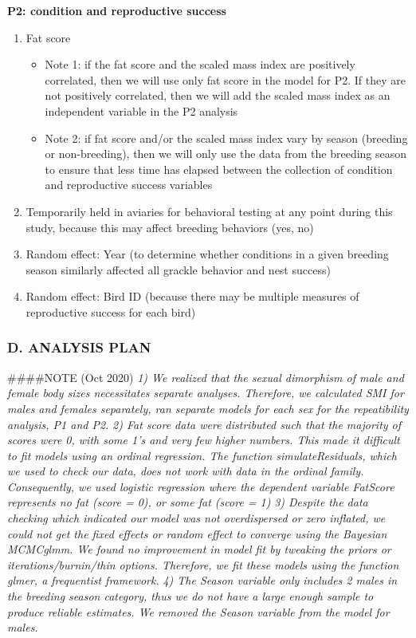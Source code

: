 \documentclass[
]{article}
\providecommand{\tightlist}{%
  \setlength{\itemsep}{0pt}\setlength{\parskip}{0pt}}
\begin{document}
\textbf{P2: condition and reproductive success}

\begin{enumerate}
\def\labelenumi{\arabic{enumi})}
\item
  Fat score

  \begin{itemize}
  \tightlist
  \item
    Note 1: if the fat score and the scaled mass index are positively
    correlated, then we will use only fat score in the model for P2. If
    they are not positively correlated, then we will add the scaled mass
    index as an independent variable in the P2 analysis
  \item
    Note 2: if fat score and/or the scaled mass index vary by season
    (breeding or non-breeding), then we will only use the data from the
    breeding season to ensure that less time has elapsed between the
    collection of condition and reproductive success variables
  \end{itemize}
\item
  Temporarily held in aviaries for behavioral testing at any point
  during this study, because this may affect breeding behaviors (yes,
  no)
\item
  Random effect: Year (to determine whether conditions in a given
  breeding season similarly affected all grackle behavior and nest
  success)
\item
  Random effect: Bird ID (because there may be multiple measures of
  reproductive success for each bird)
\end{enumerate}

\hypertarget{d.-analysis-plan}{%
\subsubsection{D. ANALYSIS PLAN}\label{d.-analysis-plan}}

\#\#\#\#NOTE (Oct 2020) \emph{1) We realized that the sexual dimorphism
of male and female body sizes necessitates separate analyses. Therefore,
we calculated SMI for males and females separately, ran separate models
for each sex for the repeatibility analysis, P1 and P2.} \emph{2) Fat
score data were distributed such that the majority of scores were 0,
with some 1's and very few higher numbers. This made it difficult to fit
models using an ordinal regression. The function simulateResiduals,
which we used to check our data, does not work with data in the ordinal
family. Consequently, we used logistic regression where the dependent
variable FatScore represents no fat (score = 0), or some fat (score =
1)} \emph{3) Despite the data checking which indicated our model was not
overdispersed or zero inflated, we could not get the fixed effects or
random effect to converge using the Bayesian MCMCglmm. We found no
improvement in model fit by tweaking the priors or
iterations/burnin/thin options. Therefore, we fit these models using the
function glmer, a frequentist framework.} \emph{4) The Season variable
only includes 2 males in the breeding season category, thus we do not
have a large enough sample to produce reliable estimates. We removed the
Season variable from the model for males.}
\end{document}
